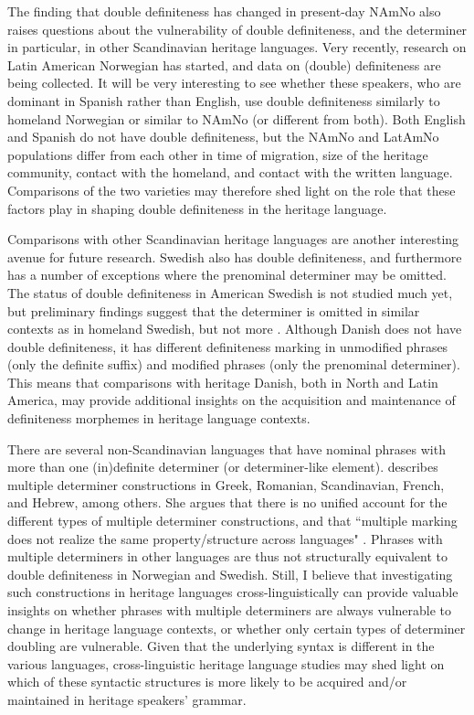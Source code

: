 \documentclass[output=paper]{langscibook}
\begin{document}
The finding that double definiteness has changed in present-day NAmNo also raises questions about the vulnerability of double definiteness, and the determiner in particular, in other Scandinavian heritage languages. Very recently, research on Latin American Norwegian has started, and data on (double) definiteness are being collected. It will be very interesting to see whether these speakers, who are dominant in Spanish rather than English, use double definiteness similarly to homeland Norwegian or similar to NAmNo (or different from both). Both English and Spanish do not have double definiteness, but the NAmNo and LatAmNo populations differ from each other in time of migration, size of the heritage community, contact with the homeland, and contact with the written language. Comparisons of the two varieties may therefore shed light on the role that these factors play in shaping double definiteness in the heritage language.

Comparisons with other Scandinavian heritage languages are another interesting avenue for future research. Swedish also has double definiteness, and furthermore has a number of exceptions where the prenominal determiner may be omitted. The status of double definiteness in American Swedish is not studied much yet, but preliminary findings suggest that the determiner is omitted in similar contexts as in homeland Swedish, but not more \citep{vanBaalLarsson2022}. Although Danish does not have double definiteness, it has different definiteness marking in unmodified phrases (only the definite suffix) and modified phrases (only the prenominal determiner). This means that comparisons with heritage Danish, both in North and Latin America, may provide additional insights on the acquisition and maintenance of definiteness morphemes in heritage language contexts.
 
There are several non-Scandinavian languages that have nominal phrases with more than one (in)definite determiner (or determiner-like element). \citet{Alexiadou2014} describes multiple determiner constructions in Greek, Romanian, Scandinavian, French, and Hebrew, among others. She argues that there is no unified account for the different types of multiple determiner constructions, and that ``multiple marking does not realize the same property/structure across languages" \citep[7]{Alexiadou2014}. Phrases with multiple determiners in other languages are thus not structurally equivalent to double definiteness in Norwegian and Swedish. Still, I believe that investigating such constructions in heritage languages cross-linguistically can provide valuable insights on whether phrases with multiple determiners are always vulnerable to change in heritage language contexts, or whether only certain types of determiner doubling are vulnerable. Given that the underlying syntax is different in the various languages, cross-linguistic heritage language studies may shed light on which of these syntactic structures is more likely to be acquired and/or maintained in heritage speakers' grammar.
 
\end{document}
